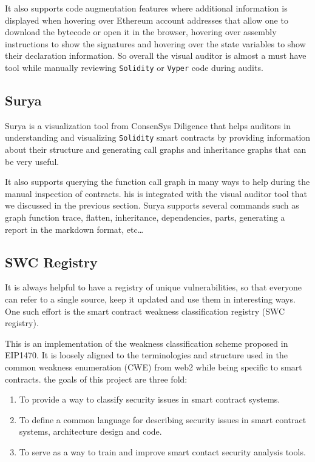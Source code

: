 It also supports code augmentation features where additional information
is displayed when hovering over Ethereum account addresses that allow
one to download the bytecode or open it in the browser, hovering over
assembly instructions to show the signatures and hovering over the state
variables to show their declaration information. So overall the visual
auditor is almost a must have tool while manually reviewing
\texttt{Solidity} or \texttt{Vyper} code during audits.

\subsection{Surya}\label{surya}

Surya is a visualization tool from ConsenSys Diligence that helps
auditors in understanding and visualizing \texttt{Solidity} smart
contracts by providing information about their structure and generating
call graphs and inheritance graphs that can be very useful.

It also supports querying the function call graph in many ways to help
during the manual inspection of contracts. his is integrated with the
visual auditor tool that we discussed in the previous section. Surya
supports several commands such as graph function trace, flatten,
inheritance, dependencies, parts, generating a report in the markdown
format, etc\ldots{}

\subsection{SWC Registry}\label{swc-registry}

It is always helpful to have a registry of unique vulnerabilities, so
that everyone can refer to a single source, keep it updated and use them
in interesting ways. One such effort is the smart contract weakness
classification registry (SWC registry).

This is an implementation of the weakness classification scheme proposed
in EIP1470. It is loosely aligned to the terminologies and structure
used in the common weakness enumeration (CWE) from web2 while being
specific to smart contracts. the goals of this project are three fold:

\begin{enumerate}
\def\labelenumi{\arabic{enumi}.}
\tightlist
\item
  To provide a way to classify security issues in smart contract
  systems.
\item
  To define a common language for describing security issues in smart
  contract systems, architecture design and code.
\item
  To serve as a way to train and improve smart contact security analysis
  tools.
\end{enumerate}

